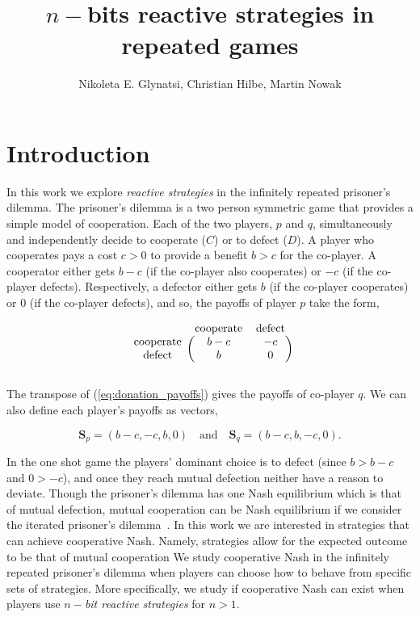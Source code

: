 \documentclass{article}
\title{$n-$bits reactive strategies in repeated games}
\author{Nikoleta E. Glynatsi, Christian Hilbe, Martin Nowak}
\date{}
\theoremstyle{definition}
\begin{document}
\maketitle

\section{Introduction}

In this work we explore \textit{reactive strategies} in the infinitely repeated
prisoner's dilemma. The prisoner's dilemma is a two person symmetric game that
provides a simple model of cooperation. Each of the two players, \(p\) and
\(q\), simultaneously and independently decide to cooperate (\(C\)) or to defect
(\(D\)). A player who cooperates pays a cost \(c > 0\) to provide a benefit
\(b > c\) for the co-player. A cooperator either gets \(b - c\) (if the
co-player also cooperates) or \(-c\) (if the co-player defects). Respectively, a defector either gets
\(b\) (if the co-player cooperates) or 0 (if the co-player defects), and so,
the payoffs of player \(p\) take the form,

\begin{equation}\label{eq:donation_payoffs}
  \begin{blockarray}{ccc}
      & \text{cooperate} & \text{defect} \\
      \begin{block}{c(cc)}
          \text{cooperate} & b - c & -c \\
          \text{defect} & b & 0 \\
      \end{block}
  \end{blockarray}
\end{equation}

The transpose of (\ref{eq:donation_payoffs}) gives the payoffs of
co-player \(q\). We can also define each player's payoffs as vectors,

\begin{equation}\label{eq:vector_payoffs}
  \mathbf{S}_{p} = (b-c, -c, b, 0) \quad \textrm{and} \quad  \mathbf{S}_{q} = (b - c, b, -c, 0).
\end{equation}

In the one shot game the players' dominant choice is to defect (since $b > b -
c$ and $0 > -c$), and once they reach mutual defection neither have a reason to
deviate. Though the prisoner's dilemma has one Nash equilibrium which is that of
mutual defection, mutual cooperation can be Nash equilibrium if we consider the
iterated prisoner's dilemma~\citep{axelrod:AAAS:1981, hilbe:PNAS:2017}. In this
work we are interested in strategies that can achieve cooperative Nash. Namely,
strategies allow for the expected outcome to be that of mutual cooperation 
We study cooperative Nash in the infinitely
repeated prisoner's dilemma when players can choose how to behave from specific
sets of strategies. More specifically, we study if cooperative Nash can exist
when players use \textit{\(n-\)bit reactive strategies} for $n > 1$.
\end{document}
